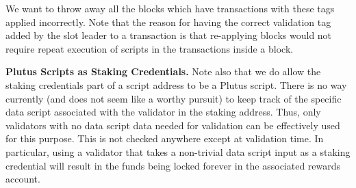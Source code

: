 We want to
throw away all the blocks which have transactions with these tags
applied incorrectly.
Note that the reason for having the correct validation tag added by the slot leader
to a transaction is that re-applying blocks would not require repeat
execution of scripts in the transactions inside a block.

\textbf{Plutus Scripts as Staking Credentials.}
Note also that we do allow the staking credentials part of a script
address to be a Plutus script. There is no way currently (and does not seem
like a worthy pursuit) to keep track of the specific data script associated with
the validator in the staking address. Thus, only validators with no
data script data needed for validation can be effectively used for this purpose.
This is not checked anywhere except at validation time. In particular,
using a validator that takes a non-trivial data script input as a staking credential
will result in the funds being locked forever in the associated rewards account.

